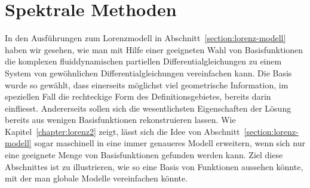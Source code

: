 %
%
%
\section{Spektrale Methoden\label{section:spektrale methoden}}
In den Ausführungen zum Lorenzmodell in Abschnitt~\ref{section:lorenz-modell}
haben wir gesehen, wie man mit Hilfe einer geeigneten Wahl von Basisfunktionen
die komplexen fluiddynamischen partiellen Differentialgleichungen zu einem
System von gewöhnlichen Differentialgleichungen vereinfachen kann.
Die Basis wurde so gewählt, dass einerseits möglichst viel geometrische
Information, im speziellen Fall die rechteckige Form des Definitionsgebietes,
bereits darin einfliesst.
Andererseits sollen sich die wesentlichsten Eigenschaften der Lösung bereits
aus wenigen Basisfunktionen rekonstruieren lassen.
Wie Kapitel~\ref{chapter:lorenz2} zeigt, lässt sich die Idee von
Abschnitt~\ref{section:lorenz-modell} sogar maschinell in eine
immer genaueres Modell erweitern, wenn sich nur eine geeignete Menge
von Basisfunktionen gefunden werden kann.
Ziel diese Abschnittes ist zu illustrieren, wie so eine Basis von
Funktionen aussehen könnte, mit der man globale Modelle vereinfachen
könnte.






